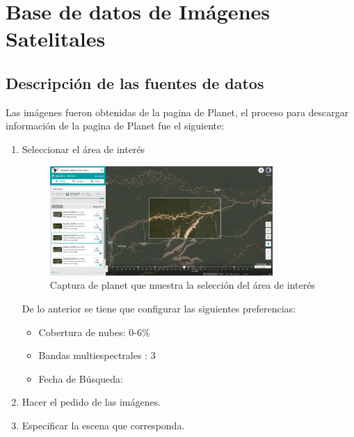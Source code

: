 \chapter{Base de datos de Imágenes Satelitales}
\label{chap:imagenes}
\section{Descripción de las fuentes de datos}
Las imágenes fueron obtenidas de la pagina de Planet, el proceso para descargar información de la pagina de Planet fue el siguiente:
\begin{enumerate}
    \item Seleccionar el área de interés 
    \begin{figure}[H]
        \centering
        \includegraphics[width = 0.8\textwidth]{images/Imagenes/capturaPlanet.png}
        \caption{Captura de planet que muestra la selección del área de interés}
        \label{fig:my_label}
    \end{figure}
    De lo anterior se tiene que configurar las siguientes preferencias:
    \begin{itemize}
        \item Cobertura de nubes:  0-6\%
        \item Bandas multiespectrales : 3
        \item Fecha de Búsqueda:
    \end{itemize}
    \item  Hacer el pedido  de las imágenes.
    \item Especificar la escena que corresponda.
    
\end{enumerate}







